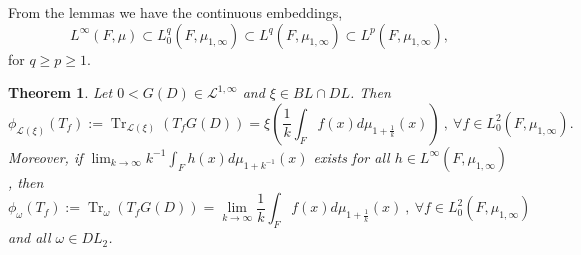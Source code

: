\documentclass[final,1p]{elsarticle}
\numberwithin{equation}{section}
\theoremstyle{plain}
\newtheorem{thm}{Theorem}[section]
\theoremstyle{definition}
\begin{document}
From the lemmas we have the continuous embeddings,
$$
L^\infty(F,\mu) \subset L^q_0(F,\mu_{1,\infty}) \subset L^q(F,\mu_{1,\infty}) \subset L^p(F,\mu_{1,\infty}),
$$
for $q \geq p \geq 1$. 

\begin{thm} \label{cor:2.3a}
Let $0 < G(D) \in \mathcal{L}^{1,\infty}$ and ${\ensuremath{\xi}} \in BL \cap DL$.
Then 
$$
\phi_{\mathcal{L}({\ensuremath{\xi}})}(T_f) :=
\operatorname{Tr}_{\mathcal{L}({\ensuremath{\xi}})}(T_fG(D)) = 
{\ensuremath{\xi}} \left( \frac{1}{k} \int_F f(x) d\mu_{1+\frac{1}{k}}(x) \right) \ , \ {\ensuremath{\forall}} f \in L^2_0(F,\mu_{1,\infty}) .
$$
Moreover, if $\lim_{k \to \infty} k^{-1} \int_F h(x) d\mu_{1+k^{-1}}(x)$ exists for all $h \in L^\infty(F,\mu_{1,\infty})$, then
$$
\phi_{\omega}(T_f) :=
\operatorname{Tr}_{\omega}(T_fG(D)) = 
\lim_{k \to \infty} \frac{1}{k} \int_F f(x) d\mu_{1+\frac{1}{k}}(x) 
\ , \ {\ensuremath{\forall}} f \in L^2_0(F,\mu_{1,\infty})
$$
and all $\omega \in DL_2$.
\end{thm}
\end{document}
